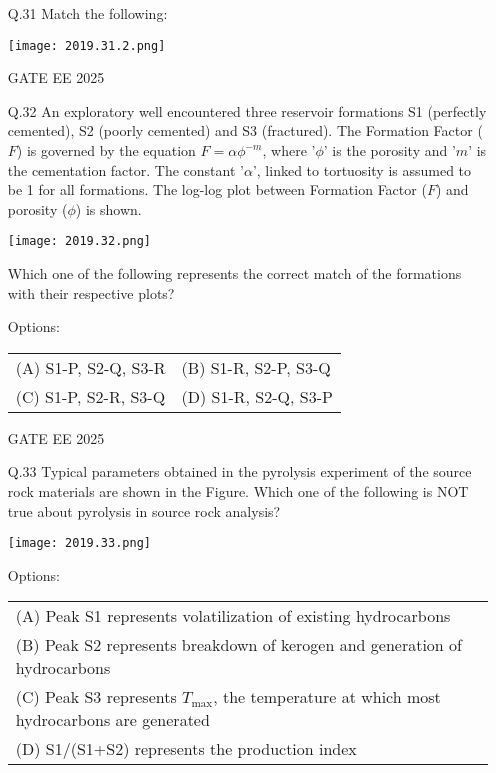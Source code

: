 \documentclass[journal]{IEEEtran}
\begin{document}
\begin{enumerate}[leftmargin=*,series=q]
\setcounter{enumi}{30} %

\item[Q.31] Match the following:

\texttt{[image: 2019.31.2.png]}

GATE EE 2025
 \vspace{0.5cm} 
\item[Q.32] An exploratory well encountered three reservoir formations S1 (perfectly cemented), S2 (poorly cemented) and S3 (fractured). The Formation Factor ($F$) is governed by the equation $F = \alpha \phi^{-m}$, where '$\phi$' is the porosity and '$m$' is the cementation factor. The constant '$\alpha$', linked to tortuosity is assumed to be 1 for all formations. The log-log plot between Formation Factor ($F$) and porosity ($\phi$) is shown.
\begin{center}
\texttt{[image: 2019.32.png]}
\end{center}

Which one of the following represents the correct match of the formations with their respective plots?

Options:
\begin{tabular}{ll}
(A) S1-P, S2-Q, S3-R & (B) S1-R, S2-P, S3-Q \\
(C) S1-P, S2-R, S3-Q & (D) S1-R, S2-Q, S3-P
\end{tabular}

GATE EE 2025
 \vspace{0.5cm} 
\item[Q.33] Typical parameters obtained in the pyrolysis experiment of the source rock materials are shown in the Figure. Which one of the following is NOT true about pyrolysis in source rock analysis?

\begin{center}
\texttt{[image: 2019.33.png]}
\end{center}

Options:
\begin{tabular}{ll}
(A) Peak S1 represents volatilization of existing hydrocarbons \\
(B) Peak S2 represents breakdown of kerogen and generation of hydrocarbons \\
(C) Peak S3 represents $T_{\text{max}}$, the temperature at which most hydrocarbons are generated \\
(D) S1/(S1+S2) represents the production index
\end{tabular}


\end{enumerate}
\end{document}
